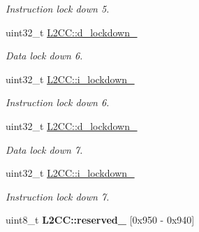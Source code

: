 \begin{DoxyCompactItemize}
\begin{DoxyCompactList}\small\item\em Instruction lock down 5. \end{DoxyCompactList}\item 
\mbox{\label{group__L2C-310__cache_ga9a9eacfc4120a031c4382279b87cbef2}} 
uint32\+\_\+t \mbox{\hyperlink{group__L2C-310__cache_ga9a9eacfc4120a031c4382279b87cbef2}{L2\+C\+C\+::d\+\_\+lockdown\+\_}}
\begin{DoxyCompactList}\small\item\em Data lock down 6. \end{DoxyCompactList}\item 
\mbox{\label{group__L2C-310__cache_gabd6ed12058feab2d04abfc185cc61ff7}} 
uint32\+\_\+t \mbox{\hyperlink{group__L2C-310__cache_gabd6ed12058feab2d04abfc185cc61ff7}{L2\+C\+C\+::i\+\_\+lockdown\+\_}}
\begin{DoxyCompactList}\small\item\em Instruction lock down 6. \end{DoxyCompactList}\item 
\mbox{\label{group__L2C-310__cache_ga289351da21270036223a31d9d0004064}} 
uint32\+\_\+t \mbox{\hyperlink{group__L2C-310__cache_ga289351da21270036223a31d9d0004064}{L2\+C\+C\+::d\+\_\+lockdown\+\_}}
\begin{DoxyCompactList}\small\item\em Data lock down 7. \end{DoxyCompactList}\item 
\mbox{\label{group__L2C-310__cache_ga025f5cca646d59500247965456ede2c9}} 
uint32\+\_\+t \mbox{\hyperlink{group__L2C-310__cache_ga025f5cca646d59500247965456ede2c9}{L2\+C\+C\+::i\+\_\+lockdown\+\_}}
\begin{DoxyCompactList}\small\item\em Instruction lock down 7. \end{DoxyCompactList}\item 
\mbox{\label{group__L2C-310__cache_ga6130f6450a36d9cbd219e9f00a90f12a}} 
uint8\+\_\+t {\bfseries L2\+C\+C\+::reserved\+\_} \mbox{[}0x950 -\/ 0x940\mbox{]}
\item 
\mbox{\label{group__L2C-310__cache_gadbfb555b4972509b0ab3787aebf3cf23}} 

\end{DoxyCompactItemize}
